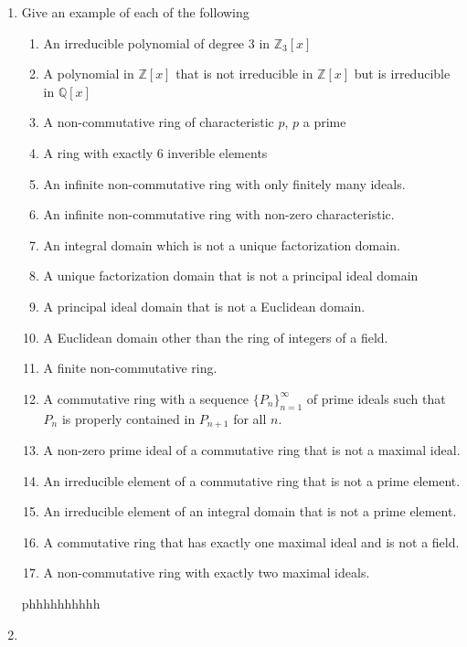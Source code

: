 \documentclass{article}
\theoremstyle{definition}
\begin{document}
\begin{enumerate}
            \item Give an example of each of the following
                \begin{enumerate}
                    \item An irreducible polynomial of degree 3 in $\mathbb{Z}_3[x]$
                    \item A polynomial in $\mathbb{Z}[x]$ that is not irreducible in $\mathbb{Z}[x]$ but is irreducible in $\mathbb{Q}[x]$
                    \item A non-commutative ring of characteristic $p$, $p$ a prime 
                    \item A ring with exactly 6 inverible elements
                    \item An infinite non-commutative ring with only finitely many ideals.
                    \item An infinite non-commutative ring with non-zero characteristic.
                    \item An integral domain which is not a unique factorization domain. 
                    \item A unique factorization domain that is not a principal ideal domain
                    \item A principal ideal domain that is not a Euclidean domain.
                    \item A Euclidean domain other than the ring of integers of a field.
                    \item A finite non-commutative ring.
                    \item A commutative ring with a sequence $\{P_n\}_{n=1}^{\infty}$ of prime ideals such that $P_n$ is properly contained in $P_{n+1}$ for all $n$.
                    \item A non-zero prime ideal of a commutative ring that is not a maximal ideal.
                    \item An irreducible element of a commutative ring that is not a prime element. 
                    \item An irreducible element of an integral domain that is not a prime element. 
                    \item A commutative ring that has exactly one maximal ideal and is not a field.
                    \item A non-commutative ring with exactly two maximal ideals.
                \end{enumerate}
            phhhhhhhhhh
            \item 

\end{enumerate}
\end{document}
